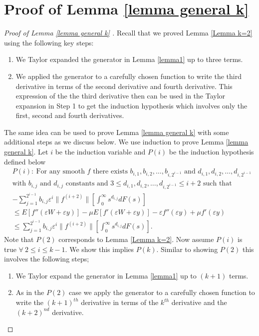 \documentclass[11pt,letterpaper,reqno]{article}
\theoremstyle{thmstyleone}%
\theoremstyle{thmstyletwo}%
\theoremstyle{thmstylethree}%
\numberwithin{equation}{section}
\begin{document}
\section{Proof of Lemma \ref{lemma general k}}\label{secB1}
\begin{proof}[Proof of Lemma \ref{lemma general k} ]
    Recall that we proved Lemma \ref{Lemma k=2} using the following key steps:
\begin{enumerate}
    \item We Taylor expanded the generator in Lemma \ref{lemma1} up to three terms.
    \item We applied the generator to a carefully chosen function to write the third derivative in terms of the second derivative and fourth derivative. 
    This expression of the the third derivative then can be used in the Taylor expansion in Step 1  to get the induction hypothesis which involves only the first, second and fourth derivatives. 
\end{enumerate}
The same idea can be used to prove Lemma \eqref{lemma general k} with some additional steps as we discuss below. 
We use induction to prove Lemma \ref{lemma general k}. Let $i$ be the induction variable and  $P(i)$ be the induction hypothesis defined below
\textit{
\begin{align}
   \nonumber &P(i):\ \text{For any smooth $f$ there exists $b_{i,1},b_{i,2}, \ldots, b_{i,2^{i-1}}$ and $d_{i,1},d_{i,2}, \ldots, d_{i,2^{i-1}}$ }\\
    &\nonumber \text{with $b_{i,j}$ and $d_{i,j}$ constants and $3 \leq d_{i,1},d_{i,2}, \ldots, d_{i,2^{i-1}} \leq i+2$ such that }\\
     &- \sum_{j=1}^{2^{i-1}}b_{i,j} \varepsilon^{i}  \|f^{(i+2)}\|  \left[ \int_0^\infty s^{d_{i,j}} dF(s)\right]  \nonumber\\
     & \leq E[f''(\varepsilon W+\varepsilon y)]-\mu E[f'(\varepsilon W+\varepsilon y)]-\varepsilon f''(\varepsilon y)+\mu f'(\varepsilon y) \nonumber\\
     &\leq \sum_{j=1}^{2^{i-1}}b_{i,j} \varepsilon^{i}  \|f^{(i+2)}\|  \left[ \int_0^\infty s^{d_{i,j}} dF(s)\right]    .
\end{align}}
Note that $P(2)$ corresponds to Lemma \ref{Lemma k=2}. Now  assume $P(i)$ is true $\forall \ 2 \leq i \leq k-1 $. We show this implies $P(k)$. Similar to showing $P(2)$ this involves the following steps;

\begin{enumerate}
    \item  We Taylor expand the generator in Lemma \ref{lemma1} up to $(k+1)$ terms.
    \item  As in the $P(2)$ case we apply the generator to a carefully chosen function to write the $(k+1)^{th}$ derivative in terms of the $k^{th}$ derivative and the $(k+2)^{nd}$ derivative. 
    \\


\end{enumerate}
\end{proof}
\end{document}
